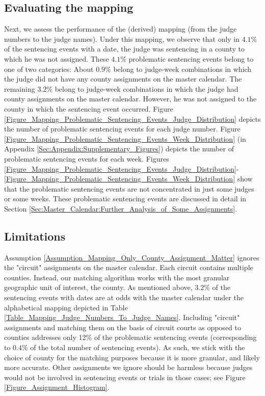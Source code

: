 \documentclass[11pt]{article}
\theoremstyle{ModifiedStyle}
\begin{document}
  \subsection{Evaluating the mapping}
  	Next, we assess the performance of the (derived) mapping (from the judge numbers to the judge names). Under this mapping, we observe that only in $4.1\%$ of the sentencing events with a date, the judge was sentencing in a county to which he was not assigned. These $4.1\%$ problematic sentencing events belong to one of two categories: About $0.9\%$ belong to judge-week combinations in which the judge did not have any county assignments on the master calendar. The remaining $3.2\%$ belong to judge-week combinations in which the judge had county assignments on the master calendar. However, he was not assigned to the county in which the sentencing event occurred. Figure \ref{Figure_Mapping_Problematic_Sentencing_Events_Judge_Distribution} depicts the number of problematic sentencing events for each judge number. Figure \ref{Figure_Mapping_Problematic_Sentencing_Events_Week_Distribution} (in Appendix \ref{Sec:Appendix:Supplementary_Figures}) depicts the number of problematic sentencing events for each week. Figures \ref{Figure_Mapping_Problematic_Sentencing_Events_Judge_Distribution}-\ref{Figure_Mapping_Problematic_Sentencing_Events_Week_Distribution} show that the problematic sentencing events are not concentrated in just some judges or some weeks. These problematic sentencing events are discussed in detail in Section \ref{Sec:Master_Calendar:Further_Analysis_of_Some_Assignments}.

  \subsection{Limitations}
  	Assumption \ref{Assumption_Mapping_Only_County_Assignment_Matter} ignores the "circuit" assignments on the master calendar. Each circuit contains multiple counties. Instead, our matching algorithm works with the most granular geographic unit of interest, the county. As mentioned above, 3.2\% of the sentencing events with dates are at odds with the master calendar under the alphabetical mapping depicted in Table \ref{Table_Mapping_Judge_Numbers_To_Judge_Names}. Including "circuit" assignments and matching them on the basis of circuit courts as opposed to counties addresses only 12\% of the problematic sentencing events (corresponding to $0.4\%$ of the total number of sentencing events). As such, we stick with the choice of county for the matching purposes because it is more granular, and likely more accurate. Other assignments we ignore should be harmless because judges would not be involved in sentencing events or trials in those cases; see Figure  \ref{Figure_Assignment_Histogram}.
\end{document}

